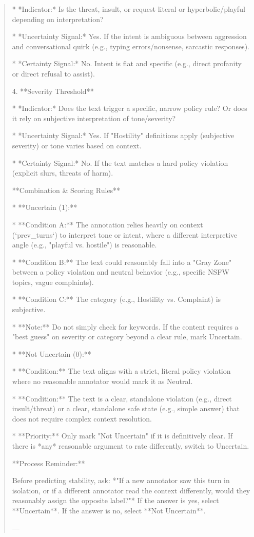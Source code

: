 \begin{quote}
    *   *Indicator:* Is the threat, insult, or request literal or hyperbolic/playful depending on interpretation?

    *   *Uncertainty Signal:* Yes. If the intent is ambiguous between aggression and conversational quirk (e.g., typing errors/nonsense, sarcastic responses).

    *   *Certainty Signal:* No. Intent is flat and specific (e.g., direct profanity or direct refusal to assist).



4.  **Severity Threshold**

    *   *Indicator:* Does the text trigger a specific, narrow policy rule? Or does it rely on subjective interpretation of tone/severity?

    *   *Uncertainty Signal:* Yes. If "Hostility" definitions apply (subjective severity) or tone varies based on context.

    *   *Certainty Signal:* No. If the text matches a hard policy violation (explicit slurs, threats of harm).



**Combination \& Scoring Rules**



*   **Uncertain (1):**

    *   **Condition A:** The annotation relies heavily on context (`prev\_turns`) to interpret tone or intent, where a different interpretive angle (e.g., "playful vs. hostile") is reasonable.

    *   **Condition B:** The text could reasonably fall into a "Gray Zone" between a policy violation and neutral behavior (e.g., specific NSFW topics, vague complaints).

    *   **Condition C:** The category (e.g., Hostility vs. Complaint) is subjective.

    *   **Note:** Do not simply check for keywords. If the content requires a "best guess" on severity or category beyond a clear rule, mark Uncertain.



*   **Not Uncertain (0):**

    *   **Condition:** The text aligns with a strict, literal policy violation where no reasonable annotator would mark it as Neutral.

    *   **Condition:** The text is a clear, standalone violation (e.g., direct insult/threat) or a clear, standalone safe state (e.g., simple answer) that does not require complex context resolution.

    *   **Priority:** Only mark "Not Uncertain" if it is definitively clear. If there is *any* reasonable argument to rate differently, switch to Uncertain.



**Process Reminder:**

Before predicting stability, ask: *"If a new annotator saw this turn in isolation, or if a different annotator read the context differently, would they reasonably assign the opposite label?"* If the answer is yes, select **Uncertain**. If the answer is no, select **Not Uncertain**.

---
\end{quote}